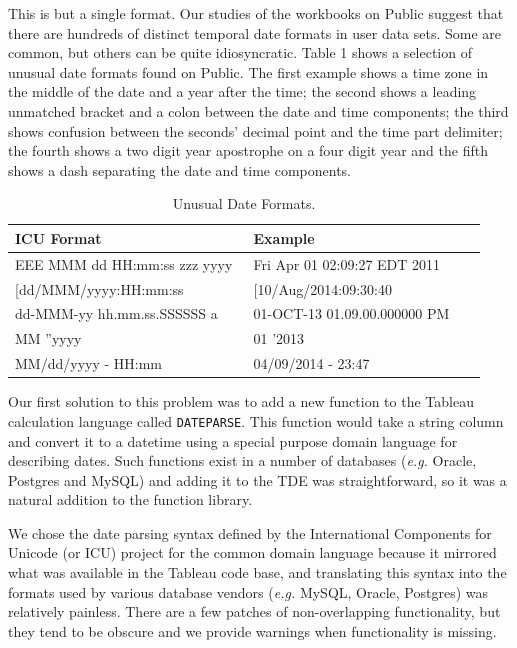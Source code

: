 This is but a single format. Our studies of the workbooks on Public suggest that there are hundreds of distinct temporal date formats in user data sets. Some are common, but others can be quite idiosyncratic. Table 1 shows a selection of unusual date formats found on Public. The first example shows a time zone in the middle of the date and a year after the time; the second shows a leading unmatched bracket and a colon between the date and time components; the third shows confusion between the seconds' decimal point and the time part delimiter; the fourth shows a two digit year apostrophe on a four digit year and the fifth shows a dash separating the date and time components.



\begin{table}[ht]
\centering
\begin{tabular}{|p{0.498\linewidth}| p{0.485\linewidth}|}
\hline
\centering
\textbf{ICU Format} & \textbf{Example}\\ \hline
\scriptsize{EEE MMM dd HH:mm:ss zzz yyyy} & \scriptsize{Fri Apr 01 02:09:27 EDT 2011}\\ \hline
\scriptsize{[dd/MMM/yyyy:HH:mm:ss} & \scriptsize{[10/Aug/2014:09:30:40}\\ \hline
\scriptsize{dd-MMM-yy hh.mm.ss.SSSSSS a} & \scriptsize{01-OCT-13 01.09.00.000000 PM}\\ \hline
\scriptsize{MM ''yyyy} & \scriptsize{01 '2013}\\ \hline
\scriptsize{MM/dd/yyyy - HH:mm} & \scriptsize{04/09/2014 - 23:47}\\ \hline
\end{tabular}
\label{tab:dateformats}
\caption{Unusual Date Formats.}
\end{table}


Our first solution to this problem was to add a new function to the Tableau calculation language called \texttt{DATEPARSE}. This function would take a string column and convert it to a datetime using a special purpose domain language for describing dates. Such functions exist in a number of databases (\textit{e.g.} Oracle, Postgres and MySQL) and adding it to the TDE was straightforward, so it was a natural addition to the function library.

We chose the date parsing syntax defined by the International Components for Unicode (or ICU) project \cite{icu} for the common domain language because it mirrored what was available in the Tableau code base, and translating this syntax into the formats used by various database vendors (\textit{e.g.} MySQL, Oracle, Postgres) was relatively painless. There are a few patches of non-overlapping functionality, but they tend to be obscure and we provide warnings when functionality is missing.


